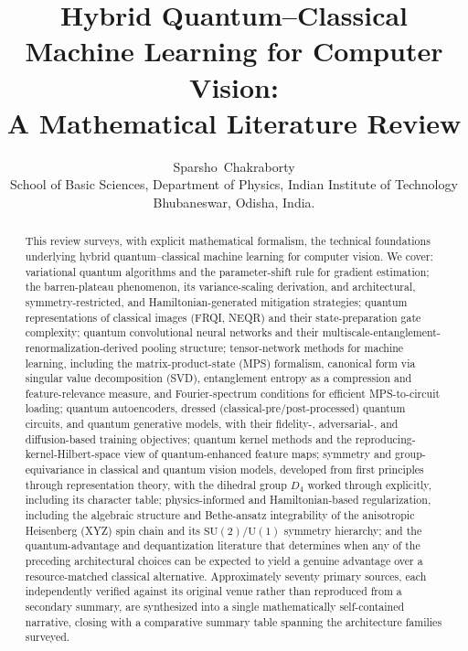 \documentclass[11pt]{article}
\title{Hybrid Quantum--Classical Machine Learning for Computer Vision:\\ A Mathematical Literature Review}
\author{Sparsho~Chakraborty\\[4pt]
\small School of Basic Sciences, Department of Physics, Indian Institute of Technology Bhubaneswar, Odisha, India.}
\date{}
\begin{document}
\maketitle

\begin{abstract}
This review surveys, with explicit mathematical formalism, the technical foundations underlying hybrid quantum--classical machine learning for computer vision. We cover: variational quantum algorithms and the parameter-shift rule for gradient estimation; the barren-plateau phenomenon, its variance-scaling derivation, and architectural, symmetry-restricted, and Hamiltonian-generated mitigation strategies; quantum representations of classical images (FRQI, NEQR) and their state-preparation gate complexity; quantum convolutional neural networks and their multiscale-entanglement-renormalization-derived pooling structure; tensor-network methods for machine learning, including the matrix-product-state (MPS) formalism, canonical form via singular value decomposition (SVD), entanglement entropy as a compression and feature-relevance measure, and Fourier-spectrum conditions for efficient MPS-to-circuit loading; quantum autoencoders, dressed (classical-pre/post-processed) quantum circuits, and quantum generative models, with their fidelity-, adversarial-, and diffusion-based training objectives; quantum kernel methods and the reproducing-kernel-Hilbert-space view of quantum-enhanced feature maps; symmetry and group-equivariance in classical and quantum vision models, developed from first principles through representation theory, with the dihedral group $D_4$ worked through explicitly, including its character table; physics-informed and Hamiltonian-based regularization, including the algebraic structure and Bethe-ansatz integrability of the anisotropic Heisenberg (XYZ) spin chain and its $\mathrm{SU}(2)/\mathrm{U}(1)$ symmetry hierarchy; and the quantum-advantage and dequantization literature that determines when any of the preceding architectural choices can be expected to yield a genuine advantage over a resource-matched classical alternative. Approximately seventy primary sources, each independently verified against its original venue rather than reproduced from a secondary summary, are synthesized into a single mathematically self-contained narrative, closing with a comparative summary table spanning the architecture families surveyed.
\end{abstract}

\tableofcontents
\end{document}
